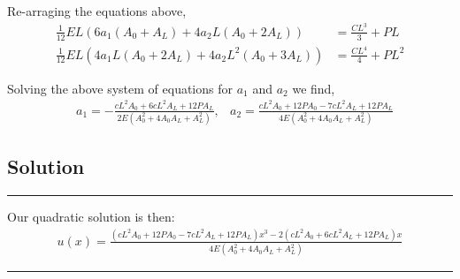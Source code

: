 \documentclass[a4paper]{memoir}
\begin{document}
Re-arraging the equations above,
\begin{align*}
	 \frac{1}{12} EL (6a_1(A_0+A_L)+4a_2L(A_0+2A_L)) &= \frac{CL^3}{3} + PL  \\
	 \frac{1}{12} EL (4a_1L(A_0+2A_L)+4a_2L^2(A_0+3A_L)) &= \frac{CL^4}{4} + PL^2 
\end{align*}

Solving the above system of equations for $a_1$ and $a_2$ we find,
\begin{align*}
	&a_1= -\frac{cL^2A_0+6cL^2A_L+12PA_L}{2E(A_0^2+4A_0A_L+A_L^2)}, 
	&a_2= \frac{cL^2A_0+12PA_0-7cL^2A_L+12PA_L}{4E(A_0^2+4A_0A_L+A_L^2)}
\end{align*}

\subsection{Solution}
\begin{minipage}{300pt}
	\begin{center}{
		\begin{shaded}
			\hrule
			\vspace{20pt}
			  Our quadratic solution is then: %
				\begin{align*}
					u(x)= \frac{(cL^2A_0+12PA_0-7cL^2A_L+12PA_L)x^3-2(cL^2A_0+6cL^2A_L+12PA_L)x}{4E(A_0^2+4A_0A_L+A_L^2)}
				\end{align*}
			\vspace{16pt}
			\hrule
		\end{shaded}
	}
	\end{center}
\end{minipage}
\end{document}
